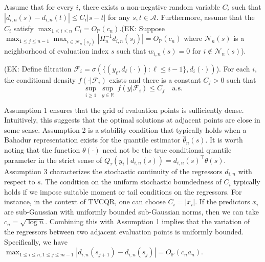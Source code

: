 \documentclass[lineno]{biometrika}
\newcommand{\ek}[1]{\textcolor{ultramarine}{(EK: #1)}}
\begin{document}
\begin{assumption}
    Assume that for every $i$, there exists a non-negative random variable $C_i$ such that $|d_{i,n}(s) - d_{i,n}(t)| \le C_i |s - t|$ for any $s, t \in \mathcal{A}$.  Furthermore, assume that the $C_i$ satisfy $\max_{1 \le i \le n} C_i = O_{\mathbb{P}}(c_n)$.\ek{Suppose $\max_{1\le j\le n-1}\max_{i\in \mathcal{N}_n(s_j)}|H_n^{-1}d_{i,n}(s_j)|=O_{\mathbb{P}}(c_n)$ where $\mathcal{N}_n(s)$ is a neighborhood of evaluation index $s$ such that $w_{i,n}(s)=0$ for $i\notin\mathcal{N}_n(s)$}. 
\end{assumption}


\begin{assumption}\label{ass:density}
\ek{Define filtration $\mathcal F_{i}=\sigma(\{(y_{\ell},d_{\ell}(\cdot)):\ell\le i-1\},d_i(\cdot))$}.
For each $i$, the conditional density $f(\cdot|\mathcal F_i)$ exists and there is a constant $C_f>0$ such that
\[
\sup_{i\ge1}\ \sup_{y\in\mathbb R}\ f(y|\mathcal F_i)\le C_f
\quad\text{a.s.}
\]
\end{assumption}


\begin{remark}
    Assumption 1 ensures that the grid of evaluation points is sufficiently dense. Intuitively, this suggests that the optimal solutions at adjacent points are close in some sense. Assumption 2 is a stability condition that typically holds when a Bahadur representation exists for the quantile estimator $\hat\theta_n(s)$. It is worth noting that the function $\theta(\cdot)$ need not be the true conditional quantile parameter in the strict sense of $Q_\tau(y_i \mid d_{i,n}(s)) = d_{i,n}(s)^\top\theta(s)$. Assumption 3 characterizes the stochastic continuity of the regressors $d_{i,n}$ with respect to $s$. The condition on the uniform stochastic boundedness of $C_i$ typically holds if we impose suitable moment or tail conditions on the regressors. For instance, in the context of TVCQR, one can choose $C_i = |x_i|$. If the predictors $x_i$ are sub-Gaussian with uniformly bounded sub-Gaussian norms, then we can take $c_n = \sqrt{\log n}$. Combining this with Assumption 1 implies that the variation of the regressors between two adjacent evaluation points is uniformly bounded. Specifically, we have $\max_{1 \le i \le n, 1 \le j \le m-1} |d_{i,n}(s_{j+1}) - d_{i,n}(s_j)| = O_{\mathbb{P}}(c_n a_n)$.
\end{remark}

    
\end{document}
